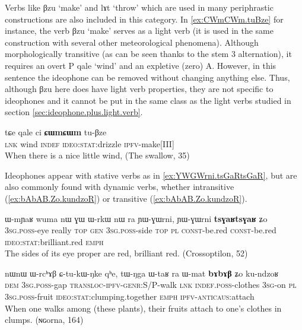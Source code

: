 \documentclass[oldfontcommands,oneside,a4paper,11pt]{article}
\newcommand{\ipa}[1]{{\phon \mbox{#1}}} %
\begin{document}
Verbs like \ipa{βzu} `make' and \ipa{lɤt} `throw' which are used in many periphrastic constructions are also included in this category. In \ref{ex:CWmCWm.tuBze} for instance, the verb \ipa{βzu} `make' serves as a light verb (it is used in the same construction with several other meteorological phenomena). Although morphologically transitive (as can be seen thanks to the stem 3 alternation), it requires an overt P \ipa{qale} `wind' and an expletive (zero) A. However, in this sentence the ideophone can be removed without changing anything else. Thus, although \ipa{βzu} here does have light verb properties, they are not specific to ideophones and it cannot be put in the same class as the light verbs studied in section \ref{sec:ideophone.plus.light.verb}.

\begin{exe}
\ex \label{ex:CWmCWm.tuBze}
\gll
\ipa{tɕe}  	\ipa{qale}  	\ipa{ci}  	\ipa{\textbf{ɕɯmɕɯm}}  	\ipa{tu-βze}  \\
\textsc{lnk} wind \textsc{indef} \textsc{ideo:stat}:drizzle \textsc{ipfv}-make[III] \\
\glt When there is a nice little wind, (The swallow, 35)
\end{exe}

Ideophones   appear with stative verbs as in \ref{ex:YWGWrni.tsGaRtsGaR}, but are also commonly found with 
dynamic verbs, whether intransitive (\ref{ex:bAbAB.Zo.kundzoR}) or transitive  (\ref{ex:bAbAB.Zo.kundzoR}).

\begin{exe}
\ex \label{ex:YWGWrni.tsGaRtsGaR}
\gll
\ipa{ɯ-mɲaʁ}  	\ipa{wuma}  	\ipa{nɯ}  	\ipa{ɣɯ}  	\ipa{ɯ-rkɯ}  	\ipa{nɯ} \ipa{ra}  	\ipa{ɲɯ-ɣɯrni,}  	\ipa{ɲɯ-ɣɯrni}  	\ipa{\textbf{tsɣaʁtsɣaʁ}}  	\ipa{ʑo}  \\
\textsc{3sg.poss}-eye really \textsc{top} \textsc{gen} \textsc{3sg.poss}-side \textsc{top} \textsc{pl} \textsc{const}-be.red  \textsc{const}-be.red \textsc{ideo:stat}:brilliant.red \textsc{emph} \\
 \glt The sides of its eye proper are red, brilliant red.  (Crossoptilon, 52)
 \end{exe}


\begin{exe}
\ex \label{ex:bAbAB.Zo.kundzoR}
\gll
\ipa{nɯnɯ}  	\ipa{ɯ-rcʰɤβ}  	\ipa{ɕ-tu-kɯ-ŋke}  	\ipa{qʰe,}  	\ipa{tɯ-ŋga}  	\ipa{ɯ-taʁ} \ipa{ra}  	\ipa{ɯ-mat}  	\ipa{\textbf{bɤbɤβ}}  	\ipa{ʑo}  	\ipa{ku-ndzoʁ} \\
\textsc{dem} \textsc{3sg.poss}-gap \textsc{transloc-ipfv-genr:}S/P-walk \textsc{lnk} \textsc{indef.poss}-clothes \textsc{3sg}-on \textsc{pl}  \textsc{3sg.poss}-fruit \textsc{ideo:stat}:clumping.together
\textsc{emph} \textsc{ipfv-anticaus}:attach \\
\glt When one walks among (these plants), their fruits attach to one's clothes in clumps. (ɴɢorna, 164)
\end{exe}
\end{document}
